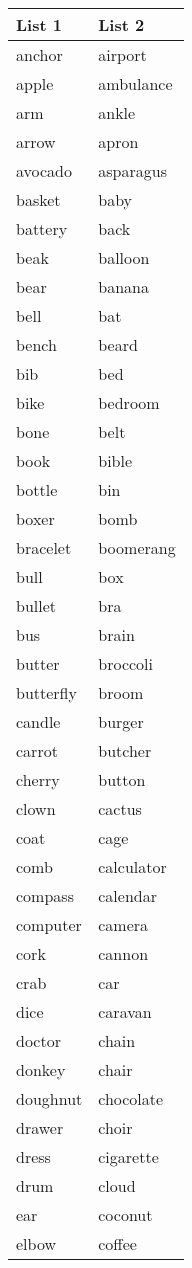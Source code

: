\documentclass[
  man,floatsintext]{apa6}
\begin{document}
\begin{longtable}{ll}
\toprule
List 1 & List 2\\
\midrule
anchor & airport\\
apple & ambulance\\
arm & ankle\\
arrow & apron\\
avocado & asparagus\\
\addlinespace
basket & baby\\
battery & back\\
beak & balloon\\
bear & banana\\
bell & bat\\
\addlinespace
bench & beard\\
bib & bed\\
bike & bedroom\\
bone & belt\\
book & bible\\
\addlinespace
bottle & bin\\
boxer & bomb\\
bracelet & boomerang\\
bull & box\\
bullet & bra\\
\addlinespace
bus & brain\\
butter & broccoli\\
butterfly & broom\\
candle & burger\\
carrot & butcher\\
\addlinespace
cherry & button\\
clown & cactus\\
coat & cage\\
comb & calculator\\
compass & calendar\\
\addlinespace
computer & camera\\
cork & cannon\\
crab & car\\
dice & caravan\\
doctor & chain\\
\addlinespace
donkey & chair\\
doughnut & chocolate\\
drawer & choir\\
dress & cigarette\\
drum & cloud\\
\addlinespace
ear & coconut\\
elbow & coffee\\

\end{longtable}
\end{document}
